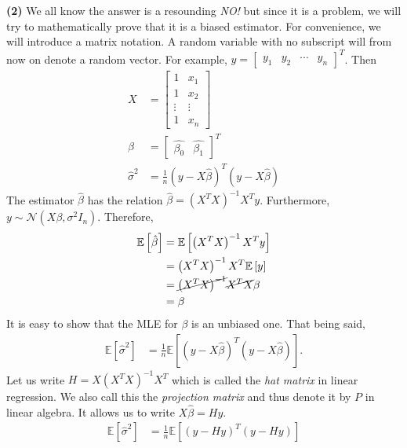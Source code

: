 \documentclass[answers]{exam}
\begin{document}
\begin{questions}
\begin{solution}
      \textbf{(2)} We all know the answer is a resounding \emph{NO!} but since it is a problem, we will try to mathematically prove that it is a biased estimator. For convenience, we will introduce a matrix notation. A random variable with no subscript will from now on denote a random vector. For example, $y = \begin{bmatrix} y_{1} & y_{2} & \cdots & y_{n}\end{bmatrix}^{T}$. Then
      \begin{align*}
         X &= \begin{bmatrix} 1  & x_{1} \\ 1 & x_{2}\\ \vdots & \vdots \\ 1 & x_{n} \end{bmatrix}\\
         \hat{\beta} &= \begin{bmatrix} \hat{\beta_{0}} & \hat{\beta_{1}} \end{bmatrix}^{T}\\
         \widehat{\sigma}^{2} &= \frac{1}{n}\left(y-X\hat{\beta}\right)^{T}\left(y-X\hat{\beta}\right)
      \end{align*}
      The estimator $\hat{\beta}$ has the relation $\hat{\beta} = \left(X^{T}X\right)^{-1}X^{T}y$. Furthermore, $y \sim \mathcal{N}\left(X\beta, \sigma^{2}I_{n}\right)$. Therefore,
      \begin{align*}
         \mathbb{E}\left[\hat{\beta}\right] &= \mathbb{E}\left[\left(X^{T}X\right)^{-1}X^{T}y\right]\\
         &= \left(X^{T}X\right)^{-1}X^{T}\mathbb{E}\left[y\right]\\
         &= \cancel{\left(X^{T}X\right)^{-1}}\cancel{X^{T}X}\beta\\
         &= \beta
      \end{align*}
      It is easy to show that the MLE for $\beta$ is an unbiased one. That being said,
      \begin{align*}
         \mathbb{E}\left[\widehat{\sigma}^{2} \right] &= \frac{1}{n}\mathbb{E}\left[\left(y-X\hat{\beta}\right)^{T}\left(y-X\hat{\beta}\right)\right].
      \end{align*}
      Let us write $H = X\left(X^{T}X\right)^{-1}X^{T}$ which is called the \emph{hat matrix} in linear regression. We also call this the \emph{projection matrix} and thus denote it by $P$ in linear algebra. It allows us to write $X\hat{\beta} = Hy$.
      \begin{align*}
         \mathbb{E}\left[\widehat{\sigma}^{2}\right] &= \frac{1}{n}\mathbb{E}\left[\left(y-Hy\right)^{T}\left(y-Hy\right)\right]\\

\end{align*}
\end{solution}
\end{questions}
\end{document}

